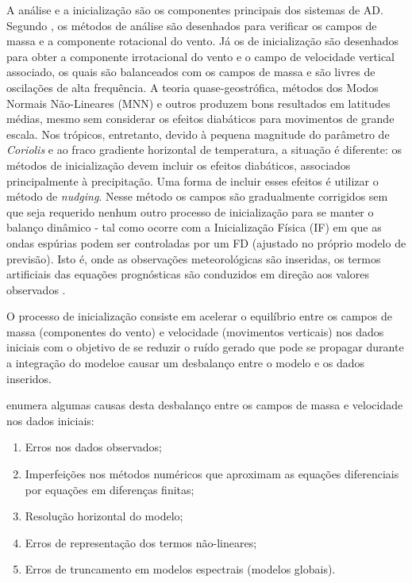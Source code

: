 A análise e a inicialização são os componentes principais dos sistemas de AD. Segundo \cite{kasahara90}, os métodos de análise são desenhados para verificar os campos de massa e a componente rotacional do vento. Já os de inicialização são desenhados para obter a componente irrotacional do vento e o campo de velocidade vertical associado, os quais são balanceados com os campos de massa e são livres de oscilações de alta frequência. A teoria quase-geostrófica, métodos dos Modos Normais Não-Lineares (MNN) e outros produzem bons resultados em latitudes médias, mesmo sem considerar os efeitos diabáticos para movimentos de grande escala. Nos trópicos, entretanto, devido à pequena magnitude do parâmetro de \textit{Coriolis} e ao fraco gradiente horizontal de temperatura, a situação é diferente: os métodos de inicialização devem incluir os efeitos diabáticos, associados principalmente à precipitação. Uma forma de incluir esses efeitos é utilizar o método de \textit{nudging}. Nesse método os campos são gradualmente corrigidos sem que seja requerido nenhum outro processo de inicialização para se manter o balanço dinâmico - tal como ocorre com a Inicialização Física (IF) em que as ondas espúrias podem ser controladas por um FD (ajustado no próprio modelo de previsão). Isto é, onde as observações meteorológicas são inseridas, os termos artificiais das equações prognósticas são conduzidos em direção aos valores observados \cite{kalnay03}. 

O processo de inicialização consiste em acelerar o equilíbrio entre os campos de massa (componentes do vento) e velocidade (movimentos verticais) nos dados iniciais com o objetivo de se reduzir o ruído gerado que pode se propagar durante a integração do modeloe causar um desbalanço entre o modelo e os dados inseridos. 

\cite{harter99} enumera algumas causas desta desbalanço entre os campos de massa e velocidade nos dados iniciais:

\begin{enumerate}
\item Erros nos dados observados;
\item Imperfeições nos métodos numéricos que aproximam as equações diferenciais por equações em diferenças finitas;
\item Resolução horizontal do modelo;
\item Erros de representação dos termos não-lineares;
\item Erros de truncamento em modelos espectrais (modelos globais).
\end{enumerate}


